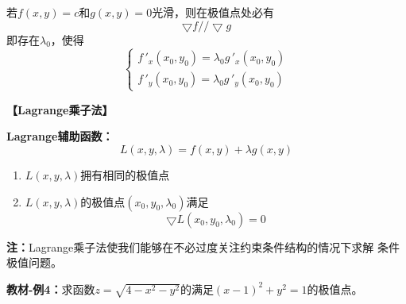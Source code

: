 若$f(x,y)=c$和$g(x,y)=0$光滑，则在极值点处必有
$${\bigtriangledown f // \bigtriangledown g}$$
即存在$\lambda_0$，使得
$$
{\left\{\begin{array}{l}
	f\,'_x(x_0,y_0)=\lambda_0g\,'_x(x_0,y_0)\\
	f\,'_y(x_0,y_0)=\lambda_0g\,'_y(x_0,y_0)
\end{array}
\right.}$$

{\bf 【Lagrange乘子法】}

{\bf Lagrange辅助函数：}
$${L(x,y,\lambda)=f(x,y)+\lambda g(x,y)}$$

\begin{enumerate}[(1)]
  \setlength{\itemindent}{1cm}
  \item $L(x,y,\lambda)$拥有相同的极值点 
  \item $L(x,y,\lambda)$的极值点$(x_0,y_0,\lambda_0)$满足 
  $$\bigtriangledown L(x_0,y_0,\lambda_0)=0$$
\end{enumerate}

{\bf 注：}Lagrange乘子法使我们能够在不必过度关注约束条件结构的情况下求解
条件极值问题。

{\bf 教材-例4：}求函数$z=\sqrt{4-x^2-y^2}$的满足$(x-1)^2+y^2=1$的极值点。

\begin{center}
\end{center}

